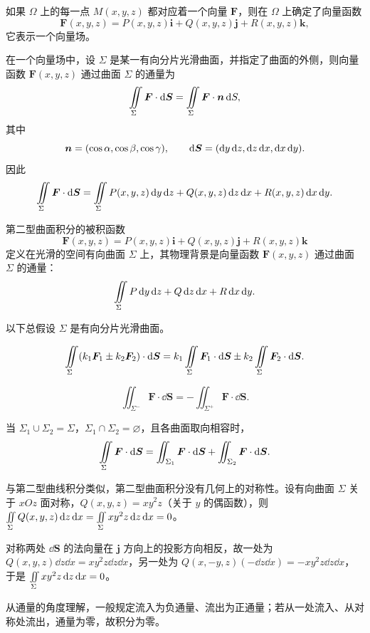

如果 $\Omega$ 上的每一点 $M(x,y,z)$ 都对应着一个向量 $\bm F$，则在 $\Omega$ 上确定了向量函数
\[
\bm F(x,y,z)=P(x,y,z)\bm i+Q(x,y,z)\bm j+R(x,y,z)\bm k,
\]
它表示一个向量场。

在一个向量场中，设 $\Sigma$ 是某一有向分片光滑曲面，并指定了曲面的外侧，则向量函数 $\bm F(x,y,z)$ 通过曲面 $\Sigma$ 的通量为
\[
\iintS\bm F\cdot\dd\bm S
=\iintS\bm F\cdot\bn\dd S,
\]
其中
\[
\bn=(\cos\alpha,\cos\beta,\cos\gamma),
\qquad
\dd\bm S=(\dd y\dd z,\dd z\dd x,\dd x\dd y).
\]
因此
\[
\iintS\bm F\cdot\dd\bm S
=\iintS P(x,y,z)\dd y\dd z
+Q(x,y,z)\dd z\dd x
+R(x,y,z)\dd x\dd y.
\]


第二型曲面积分的被积函数
\[
\bm F(x,y,z)=P(x,y,z)\bm i+Q(x,y,z)\bm j+R(x,y,z)\bm k
\]
定义在光滑的空间有向曲面 $\Sigma$ 上，其物理背景是向量函数 $\bm F(x,y,z)$ 通过曲面 $\Sigma$ 的通量：
\[
\iintS P\dd y\dd z+Q\dd z\dd x+R\dd x\dd y.
\]


以下总假设 $\Sigma$ 是有向分片光滑曲面。

\[
\iintS(k_1\bm F_1\pm k_2\bm F_2)\cdot\dd\bm S
=k_1\iintS\bm F_1\cdot\dd\bm S
\pm k_2\iintS\bm F_2\cdot\dd\bm S.
\]

\[
\iint_{\Sigma^-}\bm F\cdot\dd\bm S
=-\iint_{\Sigma^+}\bm F\cdot\dd\bm S.
\]

当 $\Sigma_1\cup\Sigma_2=\Sigma$，$\Sigma_1\cap\Sigma_2=\varnothing$，且各曲面取向相容时，
\[
\iintS\bm F\cdot\dd\bm S
=\iint_{\Sigma_1}\bm F\cdot\dd\bm S
+\iint_{\Sigma_2}\bm F\cdot\dd\bm S.
\]

\begin{notebox}
与第二型曲线积分类似，第二型曲面积分没有几何上的对称性。设有向曲面 $\Sigma$ 关于 $xOz$ 面对称，$Q(x,y,z)=xy^2z$（关于 $y$ 的偶函数），则 $\iintS Q(x,y,z)\dd z\dd x=\iintS xy^2z\dd z\dd x=0$。

 对称两处 $\dd\bm S$ 的法向量在 $\bm j$ 方向上的投影方向相反，故一处为 $Q(x,y,z)\dd z\dd x=xy^2z\dd z\dd x$，另一处为 $Q(x,-y,z)(-\dd z\dd x)=-xy^2z\dd z\dd x$，于是 $\iintS xy^2z\dd z\dd x=0$。

 从通量的角度理解，一般规定流入为负通量、流出为正通量；若从一处流入、从对称处流出，通量为零，故积分为零。
\end{notebox}

